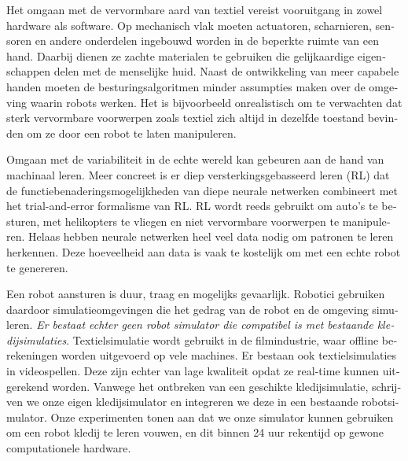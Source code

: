 \documentclass[\home/main.tex]{subfiles}
\begin{document}
\begin{otherlanguage}{dutch}
Het omgaan met de vervormbare aard van textiel vereist vooruitgang in zowel hardware als software. 
Op mechanisch vlak moeten actuatoren, scharnieren, sensoren en andere onderdelen ingebouwd worden in de beperkte ruimte van een hand. Daarbij dienen ze zachte materialen te gebruiken die gelijkaardige eigenschappen delen met de menselijke huid. Naast de ontwikkeling van meer capabele handen moeten de besturingsalgoritmen minder assumpties maken over de omgeving waarin robots werken. Het is bijvoorbeeld onrealistisch om te verwachten dat sterk vervormbare voorwerpen zoals textiel zich altijd in dezelfde toestand bevinden om ze door een robot te laten manipuleren.

Omgaan met de variabiliteit in de echte wereld kan gebeuren aan de hand van machinaal leren. Meer concreet is er diep versterkingsgebasseerd leren (RL) dat de functiebenaderingsmogelijkheden van diepe neurale netwerken combineert met het trial-and-error formalisme van \gls{RL}. RL wordt reeds gebruikt om auto's te besturen, met helikopters te vliegen en niet vervormbare voorwerpen te manipuleren. Helaas hebben neurale netwerken heel veel data nodig om patronen te leren herkennen. Deze hoeveelheid aan data is vaak te kostelijk om met een echte robot te genereren.


Een robot aansturen is duur, traag en mogelijks gevaarlijk. Robotici gebruiken daardoor simulatieomgevingen die het gedrag van de robot en de omgeving simuleren. \emph{Er bestaat echter geen robot simulator die compatibel is met bestaande kledijsimulaties}. 
Textielsimulatie wordt gebruikt in de filmindustrie, waar offline berekeningen worden uitgevoerd op vele machines. Er bestaan ook textielsimulaties in videospellen. Deze zijn echter van lage kwaliteit opdat ze real-time kunnen uitgerekend worden. Vanwege het ontbreken van een geschikte kledijsimulatie, schrijven we onze eigen kledijsimulator en integreren we deze in een bestaande robotsimulator. Onze experimenten tonen aan dat we onze simulator kunnen gebruiken om een robot kledij te leren vouwen, en dit binnen 24 uur rekentijd op gewone computationele hardware. 


\end{otherlanguage}
\end{document}
